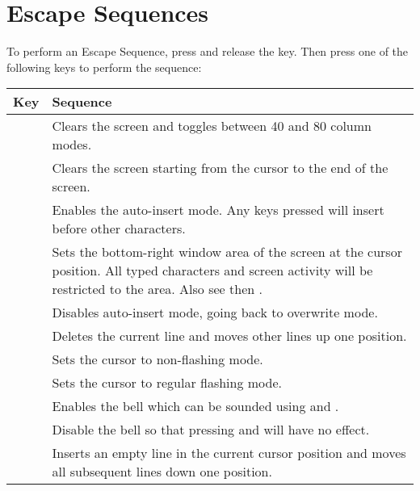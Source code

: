 \newpage



\section{Escape Sequences}
\label{appendix:escapesequences}

To perform an Escape Sequence, press and release the  key. Then press one of the following keys to perform the sequence:

\begin{center}
\begin{longtable}{C{2cm}|L{5.5cm}}
	\textbf{Key} & \textbf{Sequence}\\
   \hline
	\endhead

 &
Clears the screen and toggles between 40 and 80 column modes.\\

 &
Clears the screen starting from the cursor to the end of the screen.\\

 &
Enables the auto-insert mode. Any keys pressed will insert before other characters.\\

 &
Sets the bottom-right window area of the screen at the cursor position. All typed characters and screen activity will be restricted to the area. Also see  then .\\

 &
Disables auto-insert mode, going back to overwrite mode.\\

 &
Deletes the current line and moves other lines up one position.\\

 &
Sets the cursor to non-flashing mode.\\

 &
Sets the cursor to regular flashing mode.\\

 &
Enables the bell which can be sounded using  and .\\

 &
Disable the bell so that pressing  and  will have no effect.\\

 &
Inserts an empty line in the current cursor position and moves all subsequent lines down one position.\\


\end{longtable}
\end{center}
